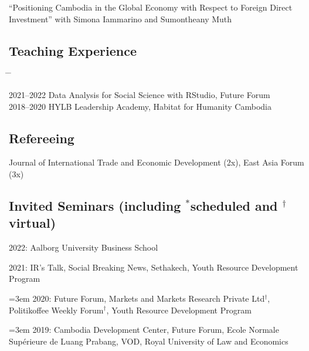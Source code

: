 \documentclass[10pt,a4paper]{article}
\newcommand{\tabbedblock}[1]{

	\begin{tabbing}
		\hspace{3cm} \= \hspace{4cm} \= \kill
		#1
	\end{tabbing}
}
\begin{document}
	``Positioning Cambodia in the Global Economy with Respect to Foreign Direct Investment'' with Simona Iammarino and Sumontheany Muth

\subsection*{Teaching Experience}

\tabbedblock{
	2021--2022 \> Data Analysis for Social Science with RStudio, Future Forum\\
	
	2018--2020 \> HYLB Leadership Academy, Habitat for Humanity Cambodia
}

\subsection*{Refereeing}
	
	Journal of International Trade and Economic Development (2x), East Asia Forum (3x)

\subsection*{Invited Seminars (including $^\ast$scheduled and $^\dag$virtual)}

	2022: Aalborg University Business School

	2021: IR’s Talk, Social Breaking News, Sethakech, Youth Resource Development Program
				
\hangindent=3em
	2020: Future Forum, Markets and Markets Research Private Ltd$^\dag$, Politikoffee Weekly Forum$^\dag$, Youth Resource Development Program

\hangindent=3em
	2019: Cambodia Development Center, Future Forum, Ecole Normale Supérieure de Luang Prabang, VOD, Royal University of Law and Economics
\end{document}
